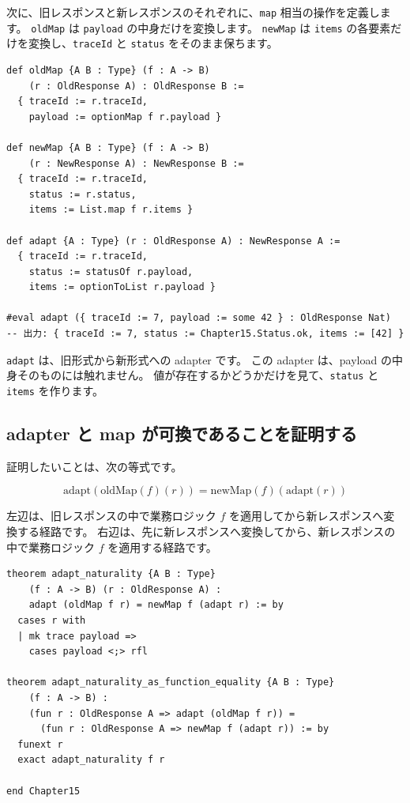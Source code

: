 次に、旧レスポンスと新レスポンスのそれぞれに、\texttt{map} 相当の操作を定義します。
\texttt{oldMap} は \texttt{payload} の中身だけを変換します。
\texttt{newMap} は \texttt{items} の各要素だけを変換し、\texttt{traceId} と \texttt{status} をそのまま保ちます。

\begin{listing}[htbp]
\begin{verbatim}
def oldMap {A B : Type} (f : A -> B)
    (r : OldResponse A) : OldResponse B :=
  { traceId := r.traceId,
    payload := optionMap f r.payload }

def newMap {A B : Type} (f : A -> B)
    (r : NewResponse A) : NewResponse B :=
  { traceId := r.traceId,
    status := r.status,
    items := List.map f r.items }

def adapt {A : Type} (r : OldResponse A) : NewResponse A :=
  { traceId := r.traceId,
    status := statusOf r.payload,
    items := optionToList r.payload }

#eval adapt ({ traceId := 7, payload := some 42 } : OldResponse Nat)
-- 出力: { traceId := 7, status := Chapter15.Status.ok, items := [42] }
\end{verbatim}
\caption{\texttt{oldMap}・\texttt{newMap}・\texttt{adapt}}
\label{lst:ch15_api_map_adapt}
\end{listing}

\texttt{adapt} は、旧形式から新形式への adapter です。
この adapter は、payload の中身そのものには触れません。
値が存在するかどうかだけを見て、\texttt{status} と \texttt{items} を作ります。

\subsection{adapter と map が可換であることを証明する}

証明したいことは、次の等式です。

\[
  \mathrm{adapt}(\mathrm{oldMap}(f)(r))
  =
  \mathrm{newMap}(f)(\mathrm{adapt}(r))
\]

左辺は、旧レスポンスの中で業務ロジック \(f\) を適用してから新レスポンスへ変換する経路です。
右辺は、先に新レスポンスへ変換してから、新レスポンスの中で業務ロジック \(f\) を適用する経路です。

\begin{listing}[htbp]
\begin{verbatim}
theorem adapt_naturality {A B : Type}
    (f : A -> B) (r : OldResponse A) :
    adapt (oldMap f r) = newMap f (adapt r) := by
  cases r with
  | mk trace payload =>
    cases payload <;> rfl

theorem adapt_naturality_as_function_equality {A B : Type}
    (f : A -> B) :
    (fun r : OldResponse A => adapt (oldMap f r)) =
      (fun r : OldResponse A => newMap f (adapt r)) := by
  funext r
  exact adapt_naturality f r

end Chapter15
\end{verbatim}
\caption{\texttt{adapt\_naturality}}
\label{lst:ch15_api_naturality}
\end{listing}

